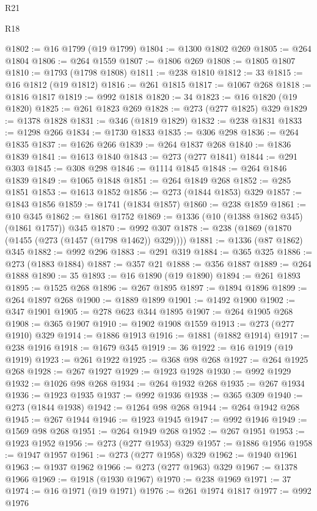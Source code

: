 \begin{lexlean}{R21}
\begin{lexlean}{R18}
\begin{coremodule}
{{{{{{{{{{{{{{{{{{{{{{{{{{{{{{{{{{{{{{{{{{{{{{{{{{{{{{{{{{{{{{{{{{{{{{{{{{{{{{{{{{{{{{{{{{{{{{{{{{{{{{{{{{{{{{{{{{{{{{{{{{{{{{{{{{{{{{{{{{{{{{{@1802 := @16 @1799 (@19 @1799)
@1804 := @1300 @1802 @269
@1805 := @264 @1804
@1806 := @264 @1559
@1807 := @1806 @269
@1808 := @1805 @1807
@1810 := @1793 (@1798 @1808)
@1811 := @238 @1810
@1812 := 33
@1815 := @16 @1812 (@19 @1812)
@1816 := @261 @1815
@1817 := @1067 @268
@1818 := @1816 @1817
@1819 := @992 @1818
@1820 := 34
@1823 := @16 @1820 (@19 @1820)
@1825 := @261 @1823 @269
@1828 := @273 (@277 @1825) @329
@1829 := @1378 @1828
@1831 := @346 (@1819 @1829)
@1832 := @238 @1831
@1833 := @1298 @266
@1834 := @1730 @1833
@1835 := @306 @298
@1836 := @264 @1835
@1837 := @1626 @266
@1839 := @264 @1837 @268
@1840 := @1836 @1839
@1841 := @1613 @1840
@1843 := @273 (@277 @1841)
@1844 := @291 @303
@1845 := @308 @298
@1846 := @1114 @1845
@1848 := @264 @1846 @1839
@1849 := @1065 @1848
@1851 := @264 @1849 @268
@1852 := @285 @1851
@1853 := @1613 @1852
@1856 := @273 (@1844 @1853) @329
@1857 := @1843 @1856
@1859 := @1741 (@1834 @1857)
@1860 := @238 @1859
@1861 := @10 @345
@1862 := @1861 @1752
@1869 := @1336 (@10 (@1388 @1862 @345) (@1861 @1757)) @345
@1870 := @992 @307
@1878 := @238 (@1869 (@1870 (@1455 (@273 (@1457 (@1798 @1462)) @329))))
@1881 := @1336 (@87 @1862) @345
@1882 := @992 @296
@1883 := @291 @319
@1884 := @365 @325
@1886 := @273 (@1883 @1884)
@1887 := @357 @21
@1888 := @356 @1887
@1889 := @264 @1888
@1890 := 35
@1893 := @16 @1890 (@19 @1890)
@1894 := @261 @1893
@1895 := @1525 @268
@1896 := @267 @1895
@1897 := @1894 @1896
@1899 := @264 @1897 @268
@1900 := @1889 @1899
@1901 := @1492 @1900
@1902 := @347 @1901
@1905 := @278 @623 @344 @1895
@1907 := @264 @1905 @268
@1908 := @365 @1907
@1910 := @1902 @1908 @1559
@1913 := @273 (@277 @1910) @329
@1914 := @1886 @1913
@1916 := @1881 (@1882 @1914)
@1917 := @238 @1916
@1918 := @1679 @345
@1919 := 36
@1922 := @16 @1919 (@19 @1919)
@1923 := @261 @1922
@1925 := @368 @98 @268
@1927 := @264 @1925 @268
@1928 := @267 @1927
@1929 := @1923 @1928
@1930 := @992 @1929
@1932 := @1026 @98 @268
@1934 := @264 @1932 @268
@1935 := @267 @1934
@1936 := @1923 @1935
@1937 := @992 @1936
@1938 := @365 @309
@1940 := @273 (@1844 @1938)
@1942 := @1264 @98 @268
@1944 := @264 @1942 @268
@1945 := @267 @1944
@1946 := @1923 @1945
@1947 := @992 @1946
@1949 := @1569 @98 @268
@1951 := @264 @1949 @268
@1952 := @267 @1951
@1953 := @1923 @1952
@1956 := @273 (@277 @1953) @329
@1957 := @1886 @1956
@1958 := @1947 @1957
@1961 := @273 (@277 @1958) @329
@1962 := @1940 @1961
@1963 := @1937 @1962
@1966 := @273 (@277 @1963) @329
@1967 := @1378 @1966
@1969 := @1918 (@1930 @1967)
@1970 := @238 @1969
@1971 := 37
@1974 := @16 @1971 (@19 @1971)
@1976 := @261 @1974 @1817
@1977 := @992 @1976
}}}}}}}}}}}}}}}}}}}}}}}}}}}}}}}}}}}}}}}}}}}}}}}}}}}}}}}}}}}}}}}}}}}}}}}}}}}}}}}}}}}}}}}}}}}}}}}}}}}}}}}}}}}}}}}}}}}}}}}}}}}}}}}}}}}}}}}}}}}}}}}
\end{coremodule}
\end{lexlean}
\end{lexlean}
